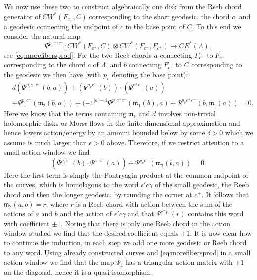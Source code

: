 \documentclass{gtpart}
\newcommand{\m}{\mathfrak{m}}
\begin{document}
We now use these two to construct algebraically one disk from the Reeb chord generator of $CW^{\ast}(F_{c_{-}},C)$ corresponding to the short geodesic, the chord $c$, and a geodesic connecting the endpoint of $c$ to the base point of $C$. To this end we consider the natural map
\[
    \Psi^{p_v c^{+}c^{-}}\colon CW^*(F_{c^{+}},C)\otimes CW^*(F_{c^{-}},F_{c^{+}})\to CE^{\ast}(\Lambda),
\] 
see \eqref{eq:morefibersprod}. For the two Reeb chords $a$ connecting $F_{c^{-}}$ to $F_{c^{+}}$
corresponding to the chord $c$ of $\Lambda$, and $b$ connecting $F_{c^{+}}$ to $C$ corresponding to
the geodesic we then have (with $p_{v}$ denoting the base point):
\begin{align*}
    &d(\Psi^{p_{v} c^+ c^-}(b,a))+ (\Psi^{p_{v}c^-}(b))\cdot (\Psi^{c^{+}c^{-}}(a))  \\ 
    &+  \Psi^{p_{v} c^-}(\m_{2}(b,a)) + (-1^{|a|-1} \Psi^{p_v c^{+} c^-}(\m_{1}(b),a)
    +\Psi^{p_v c^{+}c^{-} }(b,\m_{1}(a)) =0. 
\end{align*}
Here we know that the terms containing $\m_{1}$ and $d$ involves non-trivial holomorphic disks or Morse flows in the finite dimensional approximation and hence lowers action/energy by an amount bounded below by some $\delta>0$ which we assume is much larger than $\epsilon>0$ above. Therefore, if we restrict attention to a small action window we find
\[ (\Psi^{p_{v}c^- }(b) \cdot \Psi^{c^{+}c^{-}}(a))+\Psi^{p_{v} c^-}(\m_{2}(b,a))=0.
\]
Here the first term is simply the Pontryagin product at the common endpoint of the curves, which is
homologous to the word $\epsilon'c\gamma$ of the small geodesic, the Reeb chord and then the longer
geodesic, by rounding the corner at $c^{+}$. It follows that $\m_{2}(a,b)=r$, where $r$ is a Reeb
chord with action between the sum of the actions of $a$ and $b$ and the action of $\epsilon'c\gamma$
and that $\Psi^{c^{-}p_{v}}(r)$ contains this word with coefficient $\pm 1$. Noting that there
is only one Reeb chord in the action window studied we find that the desired coefficient equals $\pm
1$. It is now clear how to continue the induction, in each step we add one more geodesic or Reeb
chord to any word. Using already constructed curves and \eqref{eq:morefibersprod} in a small action
window we find that the map $\Psi_{1}$ has a triangular action matrix with $\pm 1$ on the diagonal,
hence it is a quasi-isomorphism. 
\end{document}
